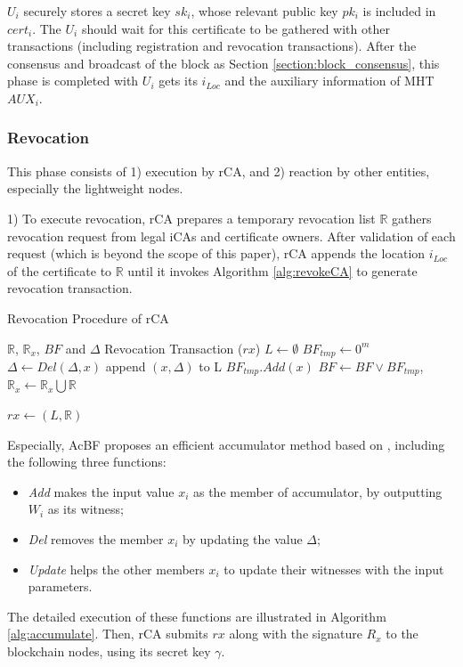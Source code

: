 \documentclass[conference]{IEEEtran}
\begin{document}
$U_i$ securely stores a secret key $sk_i$, whose relevant public key $pk_i$ is included in $cert_i$. The $U_i$ should wait for this certificate to be gathered with other transactions (including registration and revocation transactions). After the consensus and broadcast of the block as Section \ref{section:block_consensus}, this phase is completed with $U_i$ gets its $i_{Loc}$ and the auxiliary information of MHT $AUX_i$.


\subsubsection{Revocation} \label{sec:revoke}
This phase consists of 1) execution by rCA, and 2) reaction by other entities, especially the lightweight nodes. 

1) To execute revocation, rCA prepares a temporary revocation list $\mathbb{R}$ gathers revocation request from legal iCAs and certificate owners. After validation of each request (which is beyond the scope of this paper), rCA appends the location $i_{Loc}$ of the certificate to $\mathbb{R}$ until it invokes Algorithm \ref{alg:revokeCA} to generate revocation transaction. 


\begin{algorithm}[t]
\renewcommand{\algorithmicensure}{\textbf{Output:}}
	\caption{Revocation Procedure of rCA}\label{alg:revokeCA}
	\begin{algorithmic}[1]
		\Require $\mathbb{R}$, $\mathbb{R}_x$, $BF$ and $\Delta$ %
		\Ensure Revocation Transaction ($rx$)
		\State $L\gets \emptyset$
		\State $BF_{tmp} \gets 0^m$ 
		\State $\Delta \gets Del(\Delta, x)$ 
		\State append $(x, \Delta)$ to L
		\Else
		\State $BF_{tmp}.Add(x)$ %
		\EndIf
		\EndFor
		\State $BF \gets BF \lor BF_{tmp}$, $\mathbb{R}_x \gets \mathbb{R}_x \bigcup \mathbb{R} $
		
		\Return $rx \gets (L, \mathbb{R})$
	\end{algorithmic}
\end{algorithm}

Especially, AcBF proposes an efficient accumulator method based on \cite{accumulator}, including the following three functions:
\begin{itemize}
	\item \textit{Add} makes the input value $x_i$ as the member of accumulator, by outputting $W_i$ as its witness;
	\item \textit{Del} removes the member $x_i$ by updating the value $\Delta$;
	\item \textit{Update} helps the other members $x_i$ to update their witnesses with the input parameters.
\end{itemize}
The detailed execution of these functions are illustrated in Algorithm \ref{alg:accumulate}.
Then, rCA submits $rx$ along with the signature $R_x$ to the blockchain nodes, using its secret key $\gamma$.
\end{document}
